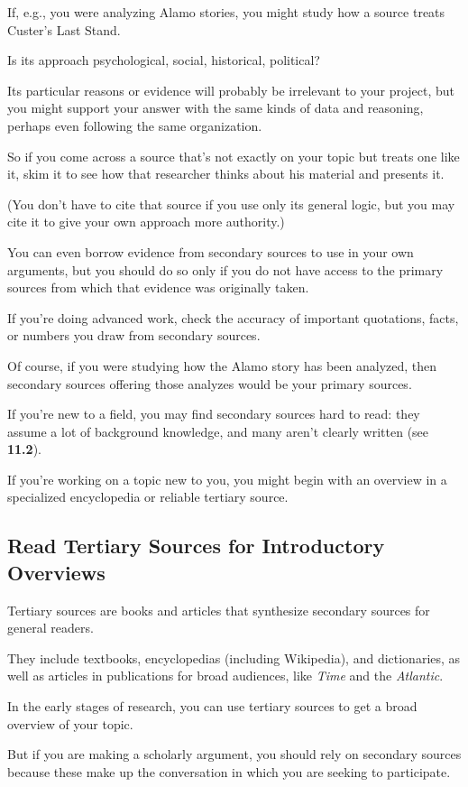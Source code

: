 \documentclass[oneside]{book}
\numberwithin{equation}{section}
\begin{document}
If, e.g., you were analyzing Alamo stories, you might study how a source treats Custer's Last Stand.

Is its approach psychological, social, historical, political?

Its particular reasons or evidence will probably be irrelevant to your project, but you might support your answer with the same kinds of data and reasoning, perhaps even following the same organization.

%
So if you come across a source that's not exactly on your topic but treats one like it, skim it to see how that researcher thinks about his material and presents it.

(You don't have to cite that source if you use only its general logic, but you may cite it to give your own approach more authority.)

%
You can even borrow evidence from secondary sources to use in your own arguments, but you should do so only if you do not have access to the primary sources from which that evidence was originally taken.

If you're doing advanced work, check the accuracy of important quotations, facts, or numbers you draw from secondary sources.

%
Of course, if you were studying how the Alamo story has been analyzed, then secondary sources offering those analyzes would be your primary sources.

%
If you're new to a field, you may find secondary sources hard to read: they assume a lot of background knowledge, and many aren't clearly written (see \textbf{11.2}).

If you're working on a topic new to you, you might begin with an overview in a specialized encyclopedia or reliable tertiary source.

\subsection{Read Tertiary Sources for Introductory Overviews}
Tertiary sources are books and articles that synthesize secondary sources for general readers.

They include textbooks, encyclopedias (including Wikipedia), and dictionaries, as well as articles in publications for broad audiences, like \textit{Time} and the \textit{Atlantic}.

In the early stages of research, you can use tertiary sources to get a broad overview of your topic.

But if you are making a scholarly argument, you should rely on secondary sources because these make up the conversation in which you are seeking to participate.
\end{document}

